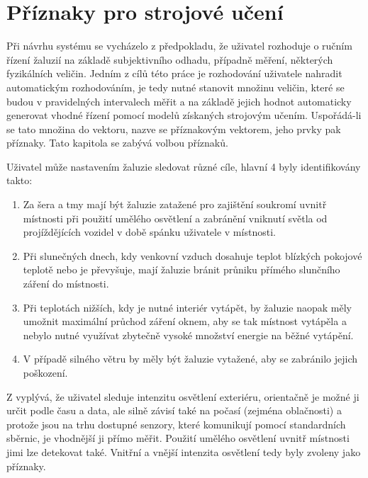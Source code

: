 \chapter{Příznaky pro strojové učení} \label{chap:features}
Při návrhu systému se vycházelo z předpokladu, že uživatel rozhoduje o ručním řízení žaluzií na základě subjektivního odhadu, případně měření, některých fyzikálních veličin. Jedním z cílů této práce je rozhodování uživatele nahradit automatickým rozhodováním, je tedy nutné stanovit množinu veličin, které se budou v pravidelných intervalech měřit a na základě jejich hodnot automaticky generovat vhodné řízení pomocí modelů získaných strojovým učením. Uspořádá-li se tato množina do vektoru, nazve se příznakovým vektorem, jeho prvky pak příznaky. Tato kapitola se zabývá volbou příznaků.

Uživatel může nastavením žaluzie sledovat různé cíle, hlavní 4 byly identifikovány takto:
\begin{enumerate}
    \item\label{itm:dark} Za šera a tmy mají být žaluzie zatažené pro zajištění soukromí uvnitř místnosti při použití umělého osvětlení a zabránění vniknutí světla od projíždějících vozidel v době spánku uživatele v místnosti.
    \item\label{itm:summer} Při slunečných dnech, kdy venkovní vzduch dosahuje teplot blízkých pokojové teplotě nebo je převyšuje, mají žaluzie bránit průniku přímého slunčního záření do místnosti.
    \item\label{itm:winter} Při teplotách nižších, kdy je nutné interiér vytápět, by žaluzie naopak měly umožnit maximální průchod záření oknem, aby se tak místnost vytápěla a nebylo nutné využívat zbytečně vysoké množství energie na běžné vytápění.
    \item\label{itm:wind} V případě silného větru by měly být žaluzie vytažené, aby se zabránilo jejich poškození.
\end{enumerate}
Z  vyplývá, že uživatel sleduje intenzitu osvětlení exteriéru, orientačně je možné ji určit podle času a data, ale silně závisí také na počasí (zejména oblačnosti) a protože jsou na trhu dostupné senzory, které komunikují pomocí standardních sběrnic, je vhodnější ji přímo měřit. Použití umělého osvětlení uvnitř místnosti jimi lze detekovat také. Vnitřní a vnější intenzita osvětlení tedy byly zvoleny jako příznaky.


